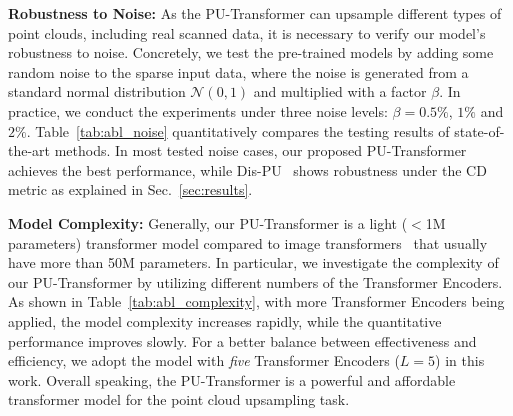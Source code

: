 \begin{table}[t]
\begin{center}
\captionsetup{font=small, skip=3pt}
\caption{Model Complexity of PU-Transformer using different numbers of Transformer Encoders. (Tested on the \emph{PU1K} dataset~\cite{qian2021pu} with a single GeForce 2080 Ti GPU.)}
\end{center}
\end{table}
\noindent \textbf{Robustness to Noise:} As the PU-Transformer can upsample different types of point clouds, including real scanned data, it is necessary to verify our model's robustness to noise. Concretely, we test the pre-trained models by adding some random noise to the sparse input data, where the noise is generated from a standard normal distribution $\mathcal{N}(0,1)$ and multiplied with a factor $\beta$. In practice, we conduct the experiments under three noise levels: $\beta = 0.5\%$, $1\%$ and $2\%$. Table~\ref{tab:abl_noise} quantitatively compares the testing results of state-of-the-art methods. In most tested noise cases, our proposed PU-Transformer achieves the best performance, while Dis-PU~\cite{li2021point} shows robustness under the CD metric as explained in Sec.~\ref{sec:results}. 

\noindent \textbf{Model Complexity:}
Generally, our PU-Transformer is a light ($<$1M parameters) transformer model compared to image transformers~\cite{khan2021transformers,liu2021swin,dosovitskiy2020image} that usually have more than 50M parameters. In particular, we investigate the complexity of our PU-Transformer by utilizing different numbers of the Transformer Encoders. As shown in Table~\ref{tab:abl_complexity}, with more Transformer Encoders being applied, the model complexity increases rapidly, while the quantitative performance improves slowly. For a better balance between effectiveness and efficiency, we adopt the model with \emph{five} Transformer Encoders ($L=5$) in this work. Overall speaking, the PU-Transformer is a powerful and affordable transformer model for the point cloud upsampling task.   

